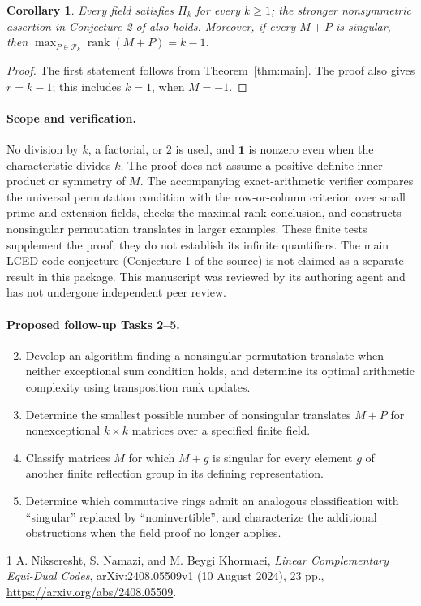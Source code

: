 \documentclass[11pt]{article}
\newtheorem{corollary}{Corollary}
\newcommand{\rank}{\operatorname{rank}}
\begin{document}
\begin{corollary}
Every field satisfies $\Pi_k$ for every $k\geq1$; the stronger
nonsymmetric assertion in Conjecture 2 of \cite{source} also holds.
Moreover, if every $M+P$ is singular, then
$\max_{P\in\mathcal P_k}\rank(M+P)=k-1$.
\end{corollary}
\begin{proof}
The first statement follows from Theorem~\ref{thm:main}.
The proof also gives $r=k-1$; this includes $k=1$, when $M=-1$.
\end{proof}

\paragraph{Scope and verification.}
No division by $k$, a factorial, or $2$ is used, and $\mathbf1$ is
nonzero even when the characteristic divides $k$. The proof does not
assume a positive definite inner product or symmetry of $M$.
The accompanying exact-arithmetic verifier compares the universal
permutation condition with the row-or-column criterion over small prime
and extension fields, checks the maximal-rank conclusion, and constructs
nonsingular permutation translates in larger examples. These finite tests
supplement the proof; they do not establish its infinite quantifiers.
The main LCED-code conjecture (Conjecture 1 of the source) is not claimed
as a separate result in this package. This manuscript was reviewed by its
authoring agent and has not undergone independent peer review.

\paragraph{Proposed follow-up Tasks 2--5.}
\begin{enumerate}
\setcounter{enumi}{1}
\item Develop an algorithm finding a nonsingular permutation translate
when neither exceptional sum condition holds, and determine its optimal
arithmetic complexity using transposition rank updates.
\item Determine the smallest possible number of nonsingular translates
$M+P$ for nonexceptional $k\times k$ matrices over a specified finite field.
\item Classify matrices $M$ for which $M+g$ is singular for every element
$g$ of another finite reflection group in its defining representation.
\item Determine which commutative rings admit an analogous classification
with ``singular'' replaced by ``noninvertible'', and characterize the
additional obstructions when the field proof no longer applies.
\end{enumerate}

\begin{thebibliography}{1}
A. Nikseresht, S. Namazi, and M. Beygi Khormaei,
\emph{Linear Complementary Equi-Dual Codes},
arXiv:2408.05509v1 (10 August 2024), 23 pp.,
\url{https://arxiv.org/abs/2408.05509}.
\end{thebibliography}
\end{document}
